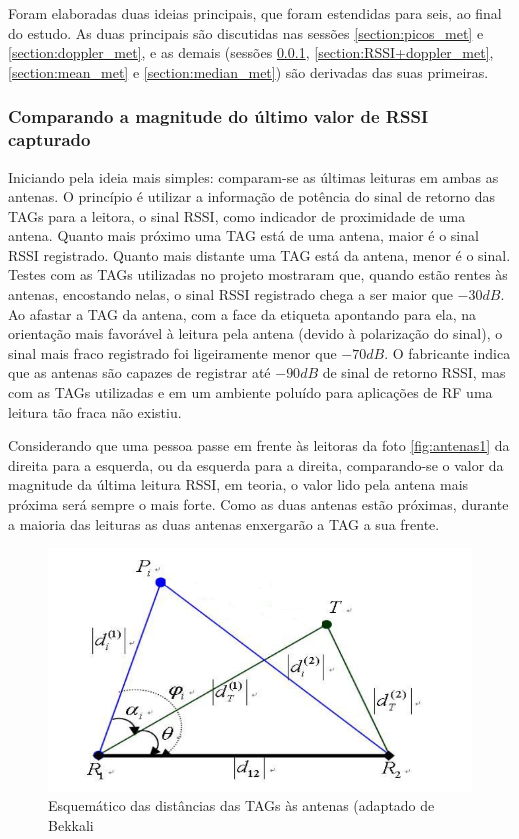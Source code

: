  Foram elaboradas duas ideias principais, que foram estendidas para seis, ao final do estudo. As duas principais são discutidas nas sessões \ref{section:picos_met} e \ref{section:doppler_met}, e as demais (sessões \ref{section:ultimo_valor_met}, \ref{section:RSSI+doppler_met}, \ref{section:mean_met} e \ref{section:median_met}) são derivadas das suas primeiras.

 \subsubsection{Comparando a magnitude do último valor de RSSI capturado} \label{section:ultimo_valor_met}
 
 Iniciando pela ideia mais simples: comparam-se as últimas leituras em ambas as antenas. O princípio é utilizar a informação de potência do sinal de retorno das TAGs para a leitora, o sinal RSSI, como indicador de proximidade de uma antena. Quanto mais próximo uma TAG está de uma antena, maior é o sinal RSSI registrado. Quanto mais distante uma TAG está da antena, menor é o sinal. Testes com as TAGs utilizadas no projeto mostraram que, quando estão rentes às antenas, encostando nelas, o sinal RSSI registrado chega a ser maior que $-30dB$. Ao afastar a TAG da antena, com a face da etiqueta apontando para ela, na orientação mais favorável à leitura pela antena (devido à polarização do sinal), o sinal mais fraco registrado foi ligeiramente menor que $-70dB$. O fabricante indica que as antenas são capazes de registrar até $-90dB$ de sinal de retorno RSSI, mas com as TAGs utilizadas e em um ambiente poluído para aplicações de RF uma leitura tão fraca não existiu.
 
 Considerando que uma pessoa passe em frente às leitoras da foto \ref{fig:antenas1} da direita para a esquerda, ou da esquerda para a direita, comparando-se o valor da magnitude da última leitura RSSI, em teoria, o valor lido pela antena mais próxima será sempre o mais forte. Como as duas antenas estão próximas, durante a maioria das leituras as duas antenas enxergarão a TAG a sua frente.
 
 \begin{figure}[H]
    \centering
    \includegraphics[width=0.8\linewidth]{figs/Metodologia/maisproxima.PNG}
    \caption{Esquemático das distâncias das TAGs às antenas (adaptado de Bekkali \cite{bekkali2007rfid}}
    \label{fig:maisproxima}
\end{figure}
 
